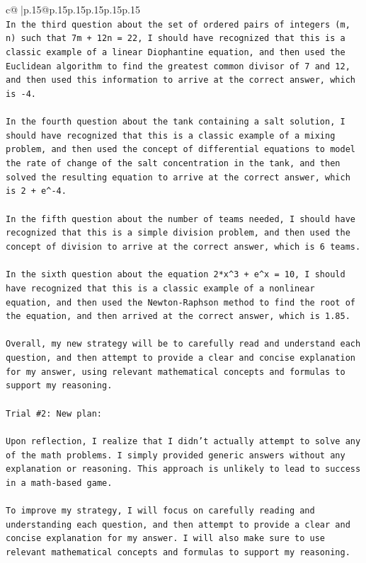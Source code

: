 \documentclass{article}
\begin{document}
{\begin{supertabular}{c@{$\;$}|p{.15\linewidth}@{}p{.15\linewidth}p{.15\linewidth}p{.15\linewidth}p{.15\linewidth}p{.15\linewidth}}
{{{\\ 
\texttt{In the third question about the set of ordered pairs of integers (m, n) such that 7m + 12n = 22, I should have recognized that this is a classic example of a linear Diophantine equation, and then used the Euclidean algorithm to find the greatest common divisor of 7 and 12, and then used this information to arrive at the correct answer, which is {-}4.} \\
\\ 
\texttt{In the fourth question about the tank containing a salt solution, I should have recognized that this is a classic example of a mixing problem, and then used the concept of differential equations to model the rate of change of the salt concentration in the tank, and then solved the resulting equation to arrive at the correct answer, which is 2 + e\^{}{-}4.} \\
\\ 
\texttt{In the fifth question about the number of teams needed, I should have recognized that this is a simple division problem, and then used the concept of division to arrive at the correct answer, which is 6 teams.} \\
\\ 
\texttt{In the sixth question about the equation 2*x\^{}3 + e\^{}x = 10, I should have recognized that this is a classic example of a nonlinear equation, and then used the Newton{-}Raphson method to find the root of the equation, and then arrived at the correct answer, which is 1.85.} \\
\\ 
\texttt{Overall, my new strategy will be to carefully read and understand each question, and then attempt to provide a clear and concise explanation for my answer, using relevant mathematical concepts and formulas to support my reasoning.} \\
\\ 
\texttt{Trial \#2: New plan: } \\
\\ 
\texttt{Upon reflection, I realize that I didn't actually attempt to solve any of the math problems. I simply provided generic answers without any explanation or reasoning. This approach is unlikely to lead to success in a math{-}based game.} \\
\\ 
\texttt{To improve my strategy, I will focus on carefully reading and understanding each question, and then attempt to provide a clear and concise explanation for my answer. I will also make sure to use relevant mathematical concepts and formulas to support my reasoning.} \\
}}}
\end{supertabular}}
\end{document}
